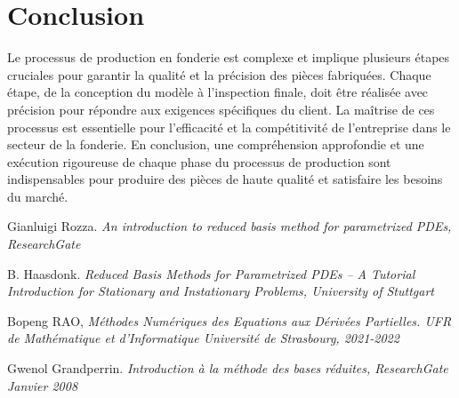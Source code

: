 \documentclass[12pt]{article}
\begin{document}
\section{Conclusion}
Le processus de production en fonderie est complexe et implique plusieurs étapes cruciales pour garantir la qualité et la précision des pièces fabriquées. Chaque étape, de la conception du modèle à l'inspection finale, doit être réalisée avec précision pour répondre aux exigences spécifiques du client. La maîtrise de ces processus est essentielle pour l'efficacité et la compétitivité de l'entreprise dans le secteur de la fonderie. En conclusion, une compréhension approfondie et une exécution rigoureuse de chaque phase du processus de production sont indispensables pour produire des pièces de haute qualité et satisfaire les besoins du marché.






\begin{thebibliography}{9}

Gianluigi Rozza.  \emph{An introduction to reduced basis method for parametrized PDEs, ResearchGate}

B. Haasdonk.  \emph{Reduced Basis Methods for Parametrized PDEs –
A Tutorial Introduction for Stationary and
Instationary Problems, University of Stuttgart  } 



Bopeng RAO,  \emph{ Méthodes Numériques
des Equations aux Dérivées Partielles. UFR de Mathématique et d’Informatique
Université de Strasbourg, 2021-2022 }

Gwenol Grandperrin.  \emph{Introduction à la méthode des bases réduites, ResearchGate Janvier 2008 }

\end{thebibliography}
\end{document}
